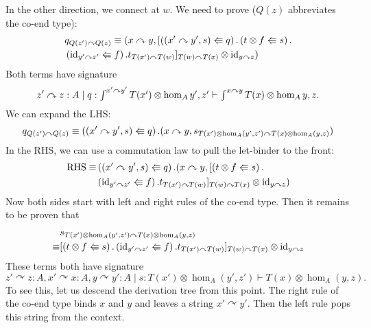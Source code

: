 \documentclass{article}
\def\cb{\mid} %
\def\jdeq{\equiv}
\def\mor#1{\hom_{#1}}
\def\id{\mathrm{id}}
\newcommand{\coend}{\begingroup\textstyle\int\endgroup}
\newcommand{\strto}{\curvearrowright}
\newcommand{\letexp}[3]{\left(#1\mathrel{\reflectbox{$\Rrightarrow$}}#2\right).#3}
\begin{document}
In the other direction, we connect at $w$.
We need to prove ($Q(z)$ abbreviates the co-end type):
\begin{align*}
	&q_{Q(z') \strto Q(z)} \jdeq (x \strto y, [\letexp{(x' \strto y', s)}{q}{\letexp{t \otimes f}{s}{ \\
	&\letexp{\id_{y' \strto z'}}{f}{t_{T(x') \strto T(w)}}}}]_{T(w) \strto T(x)} \otimes \id_{y \strto z})
\end{align*}
Both terms have signature
\begin{equation}
	z' \strto z : A \cb q : \coend^{x' \strto y'} T(x') \otimes \mor A{y', z'} \vdash \coend^{x \strto y} T(x) \otimes \mor A{y, z}.
\end{equation}
We can expand the LHS:
\begin{equation*}
q_{Q(z') \strto Q(z)} \jdeq \letexp{(x' \strto y', s)}{q}{(x \strto y, s_{T(x') \otimes \mor A(y', z') \strto T(x) \otimes \mor A(y, z)})}
\end{equation*}
In the RHS, we can use a commutation law to pull the let-binder to the front:
\begin{align*}
	\text{RHS} \jdeq &\letexp{(x' \strto y', s)}{q}{(x \strto y, [\letexp{t \otimes f}{s}{ \\
	&\letexp{\id_{y' \strto z'}}{f}{t_{T(x') \strto T(w)}}}]_{T(w) \strto T(x)} \otimes \id_{y \strto z})}
\end{align*}
Now both sides start with left and right rules of the co-end type.
Then it remains to be proven that
\begin{align*}
	&s_{T(x') \otimes \mor A(y', z') \strto T(x) \otimes \mor A(y, z)} \\
	\jdeq & [\letexp{t \otimes f}{s}{\letexp{\id_{y' \strto z'}}{f}{t_{T(x') \strto T(w)}}}]_{T(w) \strto T(x)} \otimes \id_{y \strto z}
\end{align*}
These terms both have signature
\begin{equation*}
	z' \strto z :A, x' \strto x :A, y \strto y' : A \cb s : T(x') \otimes \mor A(y', z') \vdash T(x) \otimes \mor A(y, z).
\end{equation*}
To see this, let us descend the derivation tree from this point. The right rule of the co-end type binds $x$ and $y$ and leaves a string $x' \strto y'$. Then the left rule pops this string from the context.
\end{document}
